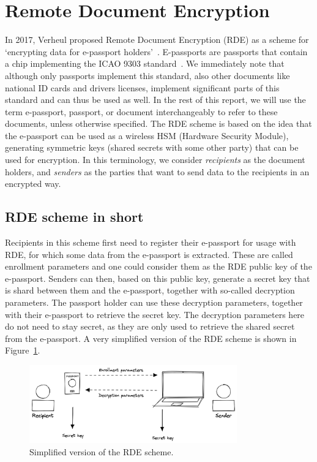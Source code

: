 \section{Remote Document Encryption}\label{sec:remote-document-encryption}
In 2017, Verheul proposed Remote Document Encryption (RDE) as a scheme for `encrypting data for e-passport holders'~\cite{verheul2017remote}.
E-passports are passports that contain a chip implementing the ICAO 9303 standard~\cite{icao9303securitymechanisms}.
We immediately note that although only passports implement this standard, also other documents like national ID cards and drivers licenses, implement significant parts of this standard and can thus be used as well.
In the rest of this report, we will use the term e-passport, passport, or document interchangeably to refer to these documents, unless otherwise specified.
The RDE scheme is based on the idea that the e-passport can be used as a wireless HSM (Hardware Security Module), generating symmetric keys (shared secrets with some other party) that can be used for encryption.
In this terminology, we consider \textit{recipients} as the document holders, and \textit{senders} as the parties that want to send data to the recipients in an encrypted way.

\subsection{RDE scheme in short}\label{subsec:rde-scheme-in-short}
Recipients in this scheme first need to register their e-passport for usage with RDE, for which some data from the e-passport is extracted.
These are called enrollment parameters and one could consider them as the RDE public key of the e-passport.
Senders can then, based on this public key, generate a secret key that is shard between them and the e-passport, together with so-called decryption parameters.
The passport holder can use these decryption parameters, together with their e-passport to retrieve the secret key.
The decryption parameters here do not need to stay secret, as they are only used to retrieve the shared secret from the e-passport.
A very simplified version of the RDE scheme is shown in Figure~\ref{fig:rde-scheme-very-simple}.
\begin{figure}
    \centering
    \includegraphics[width=0.8\textwidth]{imgs/RDE very simple}
    \caption{Simplified version of the RDE scheme.}
    \label{fig:rde-scheme-very-simple}
\end{figure}

